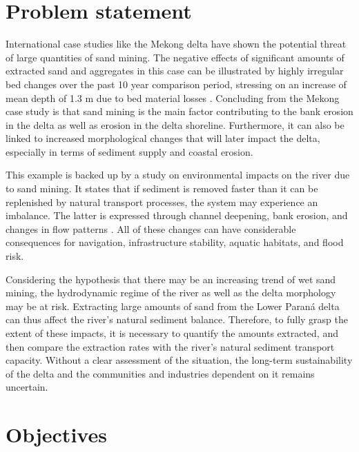 \section{Problem statement}

International case studies like the Mekong delta have shown the potential threat of large quantities of sand mining. The negative effects of significant amounts of extracted sand and aggregates in this case can be illustrated by highly irregular bed changes over the past 10 year comparison period, stressing on an increase of mean depth of 1.3 m due to bed material losses \autocite{brunierRecentMorphologicalChanges2014}. Concluding from the Mekong case study is that sand mining is the main factor contributing to the bank erosion in the delta as well as erosion in the delta shoreline. Furthermore, it can also be linked to increased morphological changes that will later impact the delta, especially in terms of sediment supply and coastal erosion.

This example is backed up by a study on environmental impacts on the river due to sand mining. It states that if sediment is removed faster than it can be replenished by natural transport processes, the system may experience an imbalance. The latter is expressed through channel deepening, bank erosion, and changes in flow patterns \autocite{rentierEnvironmentalImpactsRiver2022}. All of these changes can have considerable consequences for navigation, infrastructure stability, aquatic habitats, and flood risk. 

Considering the hypothesis that there may be an increasing trend of wet sand mining, the hydrodynamic regime of the river as well as the delta morphology may be at risk. Extracting large amounts of sand from the Lower Paraná delta can thus affect the river's natural sediment balance. Therefore, to fully grasp the extent of these impacts, it is necessary to quantify the amounts extracted, and then compare the extraction rates with the river’s natural sediment transport capacity. Without a clear assessment of the situation, the long-term sustainability of the delta and the communities and industries dependent on it remains uncertain.

\section{Objectives}


